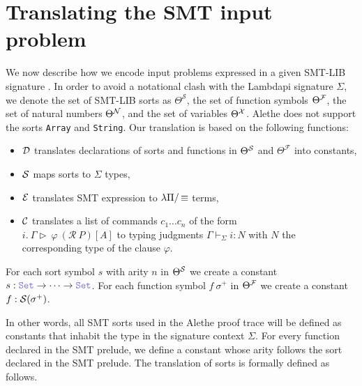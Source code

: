 \section{Translating the SMT input problem}

We now describe how we encode input problems expressed in a given
SMT-LIB signature \cite[\S 5.2.1]{smtlib}. In order to avoid a notational clash with the Lambdapi signature $\Sigma$, we denote the set of SMT-LIB sorts as $\Theta^\mathcal{S}$, the set of function symbols $\Theta^\cal{F}$, the set of natural numbers $\Theta^\cal{N}$, and the set of variables $\Theta^\cal{X}$.
Alethe does not support the sorts \texttt{Array} and \texttt{String}. Our translation is based on the following functions:
\begin{itemize}
\item $\cal{D}$ translates declarations of sorts and functions in $\Theta^\cal{S}$ and $\Theta^\mathcal{F}$ into constants,
\item $\cal{S}$ maps sorts to $\Sigma$ types,
\item $\cal{E}$ translates SMT expression to $\lpm$ terms,
\item $\cal{C}$ translates a list of commands  $c_1 \dots c_n$ of the form\\
  $i.~\Gamma \triangleright~\varphi~(\mathcal{R}~P)[A]$ to typing judgments $\Gamma \vdash_\Sigma i : N$ with $N$ the corresponding type of the clause $\varphi$.
\end{itemize}

\smallskip

\begin{definition}
For each sort symbol $s$ with arity $n$ in $\Theta^\cal{S}$ we create a constant $s: \set \ra \dots \ra \set$.
For each function symbol $f~\sigma^+$ in $\Theta^\cal{F}$ we create a constant $f: \cal{S}(\sigma^+)$.
\label{def:function-d}
\end{definition}

\smallskip

In other words, all SMT sorts used in the Alethe proof trace will be defined as constants that inhabit the type \set{} in the signature context $\Sigma$.
For every function declared in the SMT prelude, we define a constant whose arity follows the sort declared in the SMT prelude. The translation of sorts is formally defined as follows.

\smallskip

